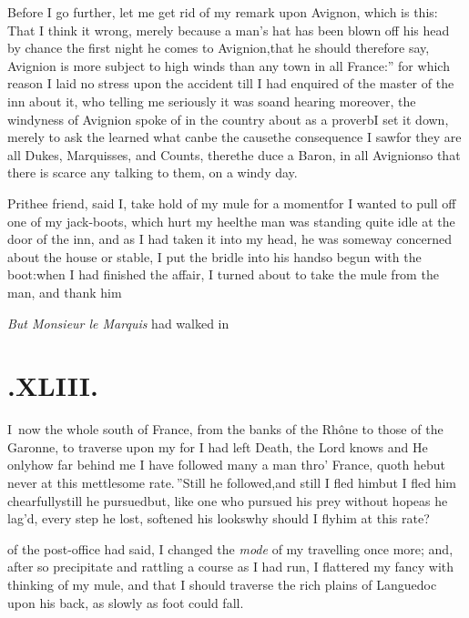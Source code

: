 \documentclass{article}
\begin{document}
Before I go further, let me get rid of my remark upon
Avignon, which is this: That I think it wrong, merely because a man’s
hat has been blown off his head by chance the first night he comes
to Avig\-nion,\tsh that he should therefore say,\break
\lqq Avignion is more subject to high winds than any town
in all France:” for which reason I laid no stress upon
the accident till I had enquired of the master of the inn about it,
who telling me seriously it was so\tsh and hearing
moreover, the windyness of Avignion spoke of in the country
about as a proverb\tsh I set it down, merely to ask the
learned what can\pb be the cause\tsh the consequence I
saw\tsk for they are all Dukes, Marquisses, and Counts,
there\tsh the duce a Baron, in all
Avignion\tsh so that there is scarce any talking to
them, on a windy day.

Prithee friend, said I, take hold of my mule for a
moment\tsh for I wanted to pull off one of my jack-boots,
which hurt my heel\tsk the man was standing quite idle at the
door of the inn, and as I had taken it into my head, he was someway
concerned about the house or stable, I put the bridle into his hand\tsk so
begun with the boot:\tsk when I had finished the affair, I turned
about to take the mule from the man, and thank
him\tsh

\tsh \textit{But Monsieur le Marquis} had walked
in\tsh

\newpage
\section{.\enspace XLIII.}

\lettrine{I}{\,} now the whole south of
France, from the banks of the Rhône to those of
the Garonne, to traverse upon my \break
\tsh for I had left Death, the Lord knows\break
\tsh and He only\tsk how far behind me\break
\tsh \lqq I have followed many a man thro’
France, quoth he\tsk but never at this mettlesome
rate.\,”\tsh Still he followed,\tsh and still
I fled him\tsh but I fled him
chearfully\tsh still he pursued\tsh but, like one
who pursued his prey without hope\tsh as he lag’d,
every step he lost, softened his looks\tsh why should I
fly\break him at this rate?

\noindent
{}\break 
of the post-office had said, I changed the\pb
\textit{mode} of my travelling once more; and,
after so precipitate and rattling a course as I had run, I
flattered my fancy with thinking of my mule, and that I should
traverse the rich plains of Languedoc upon his back, as
slowly as foot could fall.
\end{document}
